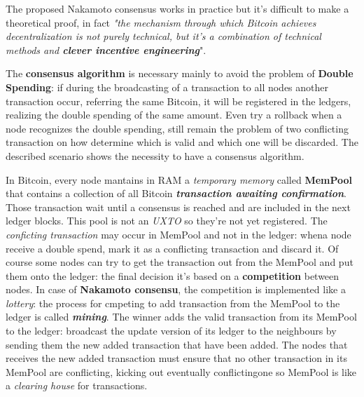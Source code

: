 \documentclass[10pt,a4paper]{report}
\begin{document}
The proposed Nakamoto consensus works in practice but it's difficult to make a theoretical proof, in fact \textit{"the mechanism through which Bitcoin achieves decentralization is not purely technical, but it’s a combination of technical methods and \textit{\textbf{clever incentive engineering}}}".

The \textbf{consensus algorithm} is necessary mainly to avoid the problem of \textbf{Double Spending}: if during the broadcasting of a transaction to all nodes another transaction occur, referring the same Bitcoin, it will be registered in the ledgers, realizing the double spending of the same amount.
Even try a rollback when a node recognizes the double spending, still remain the problem of two conflicting transaction on how determine which is valid and which one will be discarded. The described scenario shows the necessity to have a consensus algorithm.

In Bitcoin, every node mantains in RAM a \textit{temporary memory} called \textbf{MemPool} that contains a collection of all Bitcoin \textit{\textbf{transaction awaiting confirmation}}. Those transaction wait until a consensus is reached and are included in the next ledger blocks. This pool is not an \textit{UXTO} so they're not yet registered.
The \textit{conficting transaction} may occur in MemPool and not in the ledger: whena  node receive a double spend, mark it as a conflicting transaction and discard it.
Of course some nodes can try to get the transaction out from the MemPool and put them onto the ledger: the final decision it's based on a \textbf{competition} between nodes. In case of \textbf{Nakamoto consensu}, the competition is implemented like a \textit{lottery}: the process for cmpeting to add transaction from the MemPool to the ledger is called \textit{\textbf{mining}}.
The winner adds the valid transaction from its MemPool to the ledger: broadcast the update version of its ledger to the neighbours by sending them the new added transaction that have been added.
The nodes that receives the new added transaction must ensure that no other transaction in its MemPool are conflicting, kicking out eventually conflictingone so MemPool is like a \textit{clearing house} for transactions.
\end{document}

